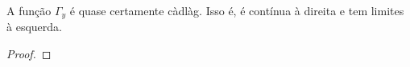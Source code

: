\begin{proposicao}
  \label{prop:gamma-cadlag}
  A função $\Gamma_y$ é quase certamente càdlàg. Isso é, é contínua à
  direita e tem limites à esquerda.
\end{proposicao}
\begin{proof}












\end{proof}


